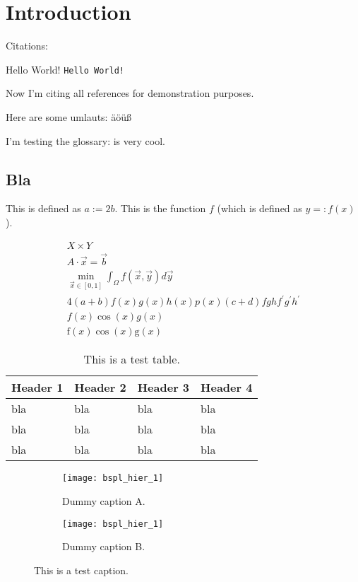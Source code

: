 
\chapter{Introduction}


Citations:
\cite{Boor72Calculating}

Hello World! \texttt{Hello World!}

Now I'm citing all references for demonstration purposes.
\nocite{*}

Here are some umlauts: äöüß

I'm testing the glossary:
\sgpp is very cool.

\section{Bla}

This is defined as $a := 2b$.
This is the function $f$ (which is defined as $y =: f(x)$).

\begin{gather}
  X \times Y\\
  A \cdot \vec{x} = \vec{b}\\
  \min_{\vec{x} \in [0, 1]} \int_\Omega f(\vec{x}, \vec{y}) d\vec{y}\\
  4(a+b)f(x)g(x)h(x)p(x)(c+d)fghf^\prime g^\prime h^\prime\\
  f(x)\cos(x)g(x)\\
  \mathrm{f}(x)\cos(x)\mathrm{g}(x)
\end{gather}

\begin{table}
  \begin{tabular}{llll}
    \toprule
    \textbf{Header 1}&\textbf{Header 2}&\textbf{Header 3}&\textbf{Header 4}\\
    \midrule
    bla&bla&bla&bla\\
    bla&bla&bla&bla\\
    bla&bla&bla&bla\\
    \bottomrule
  \end{tabular}
  \caption{This is a test table.}
  \label{tbl:test}
\end{table}

\begin{figure}
  \begin{subfigure}{65mm}
    \texttt{[image: bspl\_hier\_1]}
    \caption{Dummy caption A.}
    \label{fig:test1a}
  \end{subfigure}
  \hspace{3mm}
  \begin{subfigure}{65mm}
    \texttt{[image: bspl\_hier\_1]}
    \caption{Dummy caption B.}
    \label{fig:test1b}
  \end{subfigure}
  \caption{This is a test caption.}
  \label{fig:test1}
\end{figure}

